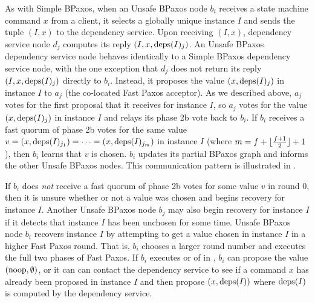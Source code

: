 As with Simple BPaxos, when an Unsafe BPaxos node $b_i$ receives a state
machine command $x$ from a client, it selects a globally unique instance $I$
and sends the tuple $(I, x)$ to the dependency service. Upon receiving $(I,
x)$, dependency service node $d_j$ computes its reply $(I, x, \text{deps}(I)_j)$.  An
Unsafe BPaxos dependency service node behaves identically to a Simple BPaxos
dependency service node, with the one exception that $d_j$ does not return its
reply $(I, x, \text{deps}(I)_j)$ directly to $b_i$. Instead, it proposes the value
$(x, \text{deps}(I)_j)$ in instance $I$ to $a_j$ (the co-located Fast Paxos
acceptor). As we described above, $a_j$ votes for the first proposal that it
receives for instance $I$, so $a_j$ votes for the value $(x, \text{deps}(I)_j)$ in
instance $I$ and relays its phase 2b vote back to $b_i$.
%
If $b_i$ receives a fast quorum of phase 2b votes for the same value $v = (x,
\text{deps}(I)_{j_1}) = \cdots = (x, \text{deps}(I)_{j_m})$ in instance $I$ (where $m =
f + \lfloor\frac{f + 1}{2}\rfloor + 1$), then $b_i$ learns that $v$ is chosen. $b_i$ updates its
partial BPaxos graph and informs the other Unsafe BPaxos nodes. This
communication pattern is illustrated in .



If $b_i$ does \emph{not} receive a fast quorum of phase 2b votes for some value
$v$ in round 0, then it is unsure whether or not a value was chosen and begins
recovery for instance $I$. Another Unsafe BPaxos node $b_j$ may also begin
recovery for instance $I$ if it detects that instance $I$ has been unchosen for
some time.
%
Unsafe BPaxos node $b_i$ recovers instance $I$ by attempting to get a value
chosen in instance $I$ in a higher Fast Paxos round. That is, $b_i$ chooses a
larger round number and executes the full two phases of Fast Paxos. If $b_i$
executes  or  of
 in , $b_i$ can propose the value
$(\text{noop}, \emptyset)$, or it can can contact the dependency service to see if a
command $x$ has already been proposed in instance $I$ and then propose $(x,
\text{deps}(I))$ where $\text{deps}(I)$ is computed by the dependency service.

